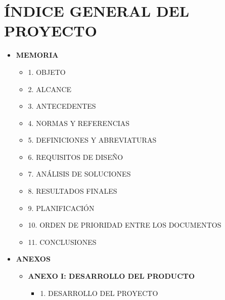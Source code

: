 \documentclass[11pt,a4paper]{article}
\begin{document}
\section*{ÍNDICE GENERAL DEL PROYECTO}
\vspace{0.2cm}

\begin{itemize}[label={}, leftmargin=0cm, itemsep=1.2em]


    \item \Large\textbf{\color{ArthroNavy}MEMORIA} 
    \begin{itemize}[label=\color{ArthroTeal}\textbullet, leftmargin=0.6cm, itemsep=0.3em, topsep=0.3cm]
        \normalsize
        \item 1. OBJETO 
        \item 2. ALCANCE 
        \item 3. ANTECEDENTES 
        \item 4. NORMAS Y REFERENCIAS 
        \item 5. DEFINICIONES Y ABREVIATURAS 
        \item 6. REQUISITOS DE DISEÑO 
        \item 7. ANÁLISIS DE SOLUCIONES 
        \item 8. RESULTADOS FINALES 
        \item 9. PLANIFICACIÓN 
        \item 10. ORDEN DE PRIORIDAD ENTRE LOS DOCUMENTOS 
        \item 11. CONCLUSIONES
    \end{itemize}

\vspace{0.2cm}

    \item \Large\textbf{\color{ArthroNavy}ANEXOS} 
    \begin{itemize}[label=\color{ArthroTeal}\textbullet, leftmargin=0.6cm, itemsep=0.5em, topsep=0.3cm]
        \normalsize
        \item \textbf{ANEXO I: DESARROLLO DEL PRODUCTO} 
        \begin{itemize}[label=\color{ArthroGray}\circ, leftmargin=0.5cm, itemsep=0.2em, topsep=0.1cm]
            \small
            \item 1. DESARROLLO DEL PROYECTO 
        \end{itemize}
        

\end{itemize}
\end{itemize}
\end{document}
